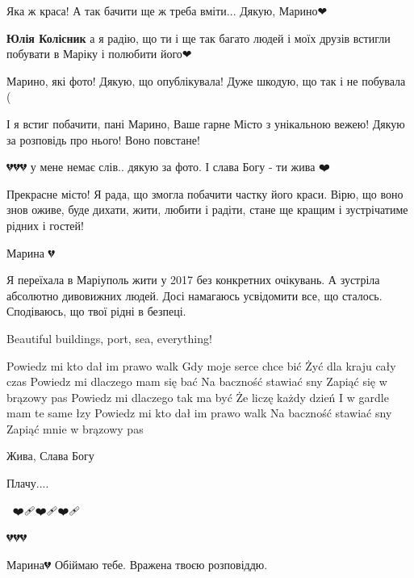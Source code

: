  
 
 
 
 

\qqSecCmt


Яка ж краса! А так бачити ще ж треба вміти... Дякую, Марино❤

\begin{itemize} %
\textbf{Юлія Колісник} а я радію, що ти і ще так багато людей і моїх друзів встигли побувати в Маріку і полюбити його❤
\end{itemize} %


Марино, які фото! Дякую, що опублікувала! Дуже шкодую, що так і не побувала (


І я встиг побачити, пані Марино, Ваше гарне Місто з унікальною вежею! Дякую за розповідь про нього! Воно повстане!


💔💔💔 у мене немає слів.. дякую за фото. І слава Богу - ти жива ❤️


Прекрасне місто! Я рада, що змогла побачити частку його краси. Вірю, що воно
знов оживе, буде дихати, жити, любити і радіти, стане ще кращим і зустрічатиме
рідних і гостей!💙💛


Марина 💔


Я переїхала в Маріуполь жити у 2017 без конкретних очікувань. А зустріла
абсолютно дивовижних людей. Досі намагаюсь усвідомити все, що сталось.
Сподіваюсь, що твої рідні в безпеці.


Beautiful buildings, port, sea, everything!


\obeycr
Powiedz mi kto dał im prawo walk
Gdy moje serce chce bić
Żyć dla kraju cały czas
Powiedz mi dlaczego mam się bać
Na baczność stawiać sny
Zapiąć się w brązowy pas
Powiedz mi dlaczego tak ma być
Że liczę każdy dzień
I w gardle mam te same łzy
Powiedz mi kto dał im prawo walk
Na baczność stawiać sny
Zapiąć mnie w brązowy pas
\restorecr


Жива, Слава Богу

Плачу....

🙏🏻❤️🩹❤️🩹❤️🩹


💔💔💔


Марина💔 Обіймаю тебе. Вражена твоєю розповіддю.
